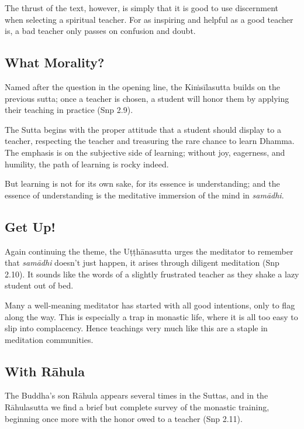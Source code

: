 \documentclass[12pt,openany]{book}%
\begin{document}
The thrust of the text, however, is simply that it is good to use discernment when selecting a spiritual teacher. For as inspiring and helpful as a good teacher is, a bad teacher only passes on confusion and doubt.

\subsection*{What Morality?}

Named after the question in the opening line, the \textsanskrit{Kiṁsīlasutta} builds on the previous sutta; once a teacher is chosen, a student will honor them by applying their teaching in practice (Snp 2.9).

The Sutta begins with the proper attitude that a student should display to a teacher, respecting the teacher and treasuring the rare chance to learn Dhamma. The emphasis is on the subjective side of learning; without joy, eagerness, and humility, the path of learning is rocky indeed.

But learning is not for its own sake, for its essence is understanding; and the essence of understanding is the meditative immersion of the mind in \textit{\textsanskrit{samādhi}}.

\subsection*{Get Up!}

Again continuing the theme, the \textsanskrit{Uṭṭhānasutta} urges the meditator to remember that \textit{\textsanskrit{samādhi}} doesn’t just happen, it arises through diligent meditation (Snp 2.10). It sounds like the words of a slightly frustrated teacher as they shake a lazy student out of bed.

Many a well-meaning meditator has started with all good intentions, only to flag along the way. This is especially a trap in monastic life, where it is all too easy to slip into complacency. Hence teachings very much like this are a staple in meditation communities.

\subsection*{With \textsanskrit{Rāhula}}

The Buddha’s son \textsanskrit{Rāhula} appears several times in the Suttas, and in the \textsanskrit{Rāhulasutta} we find a brief but complete survey of the monastic training, beginning once more with the honor owed to a teacher (Snp 2.11).
\end{document}
